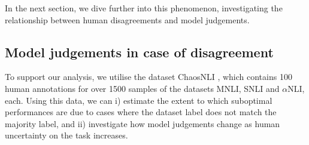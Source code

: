 In the next section, we dive further into this phenomenon, investigating the relationship between human disagreements and model judgements.


\subsection{Model judgements in case of disagreement}\label{subsec:chaosnli}

% 
% 

To support our analysis, we utilise the dataset ChaosNLI \citep{nie-etal-2020-learn}, which contains 100 human annotations for over 1500 samples of the datasets MNLI, SNLI and $\alpha$NLI, each.
Using this data, we can i) estimate the extent to which suboptimal performances are due to cases where the dataset label does not match the majority label, and ii) investigate how model judgements change as human uncertainty on the task increases.

